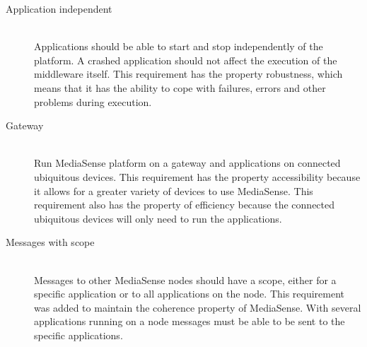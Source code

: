 \begin{description}
	\item[Application independent] \hfill \\
	Applications should be able to start and stop independently of the platform. A crashed application should not affect the execution of the middleware itself. This requirement has the property robustness, which means that it has the ability to cope with failures, errors and other problems during execution.
	
	\item[Gateway] \hfill \\
	Run MediaSense platform on a gateway and applications on connected ubiquitous devices.
This requirement has the property accessibility because it allows for a greater variety of devices to use MediaSense. This requirement also has the property of efficiency because the connected ubiquitous devices will only need to run the applications.
	
	\item[Messages with scope] \hfill \\
	Messages to other MediaSense nodes should have a scope, either for a specific application or to all applications on the node. This requirement was added to maintain the coherence property of MediaSense. With several applications running on a node messages must be able to be sent to the specific applications.

	
\end{description}	

